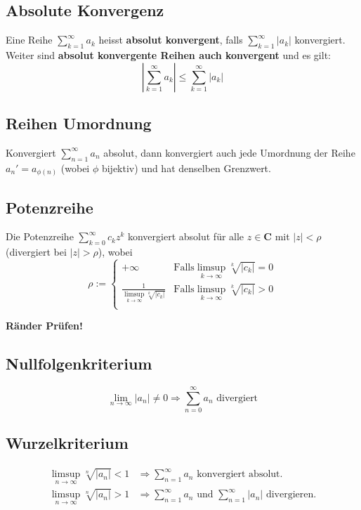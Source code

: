 \documentclass[8pt]{article}
\begin{document}
\begin{multicols*}{3}
\subsection {Absolute Konvergenz}
Eine Reihe $\sum_{k = 1}^{\infty} a_k$ heisst \textbf{absolut konvergent},
falls $\sum_{k = 1}^{\infty} |a_k|$ konvergiert. Weiter sind \textbf{absolut konvergente Reihen
auch konvergent} und es gilt:
$$
  \left| \sum_{k = 1}^{\infty} a_k \right| \leq \sum_{k = 1}^{\infty} |a_k|
$$

\subsection{Reihen Umordnung}

Konvergiert $\sum_{n = 1}^\infty a_n$ absolut, dann konvergiert auch jede Umordnung
der Reihe $a_n' = a_{\phi(n)}$ (wobei $\phi$ bijektiv) und hat denselben Grenzwert.

\subsection {Potenzreihe}
Die Potenzreihe $\sum_{k = 0}^\infty c_k z^k$ konvergiert absolut für alle $z \in \mathbf{C}$
mit $|z| < \rho$ (divergiert bei $|z| > \rho$), wobei
$$
  \rho := \begin{cases}
    +\infty &\text{Falls} \limsup_{k \rightarrow \infty} \sqrt[k]{|c_k|} = 0\\
    \frac{1}{\limsup_{k \rightarrow \infty} \sqrt[k]{|c_k|}} &\text{Falls} \limsup_{k \rightarrow \infty} \sqrt[k]{|c_k|} > 0\\
  \end{cases}
$$
\begin{center}
  \color{red}
  \textbf{Ränder Prüfen!}
\end{center}
\subsection{Nullfolgenkriterium}
$$
  \lim_{n \rightarrow \infty} |a_n| \neq 0 \Rightarrow \sum_{n = 0}^\infty a_n \text{ divergiert}
$$

\subsection{Wurzelkriterium}

\begin{align*}
  \limsup_{n \rightarrow \infty} \sqrt[n]{|a_n|} < 1 &\Rightarrow \sum_{n = 1}^\infty a_n \text{ konvergiert absolut.}\\
  \limsup_{n \rightarrow \infty} \sqrt[n]{|a_n|} > 1 &\Rightarrow \sum_{n = 1}^\infty a_n \text{ und } \sum_{n = 1}^\infty |a_n| \text{ divergieren.}
\end{align*}


\end{multicols*}
\end{document}
